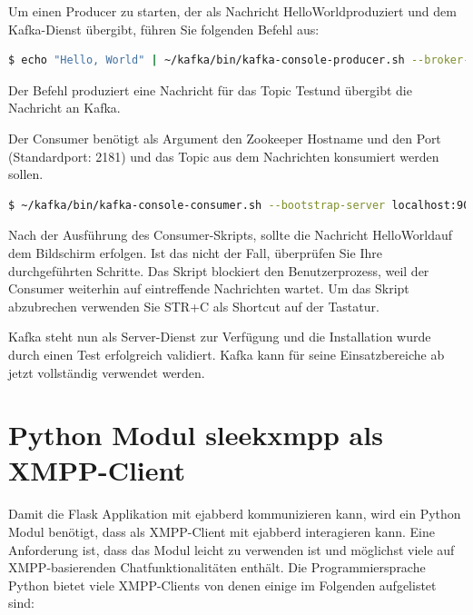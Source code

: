 \documentclass[a4paper,titlepage,halfparskip,12pt]{scrreprt}
\begin{document}
\begin{onehalfspacing}
Um einen Producer zu starten, der als Nachricht \glqq HelloWorld\grqq produziert und dem Kafka-Dienst übergibt, führen Sie folgenden Befehl aus:

\smallskip

\begin{lstlisting}[language=Bash]
$ echo "Hello, World" | ~/kafka/bin/kafka-console-producer.sh --broker-list localhost:9092 --topic Test > /dev/null
\end{lstlisting}

Der Befehl produziert eine Nachricht für das Topic \glqq Test\grqq und übergibt die Nachricht an Kafka.

Der Consumer benötigt als Argument den Zookeeper Hostname und den Port (Standardport: 2181) und das Topic aus dem Nachrichten konsumiert werden sollen.

\smallskip

\begin{lstlisting}[language=Bash]
$ ~/kafka/bin/kafka-console-consumer.sh --bootstrap-server localhost:9092 --topic Test --from-beginning
\end{lstlisting}

Nach der Ausführung des Consumer-Skripts, sollte die Nachricht \glqq HelloWorld\grqq auf dem Bildschirm erfolgen. Ist das nicht der Fall, überprüfen Sie Ihre durchgeführten Schritte. Das Skript blockiert den Benutzerprozess, weil der Consumer weiterhin auf eintreffende Nachrichten wartet. Um das Skript abzubrechen verwenden Sie STR+C als Shortcut auf der Tastatur.

Kafka steht nun als Server-Dienst zur Verfügung und die Installation wurde durch einen Test erfolgreich validiert. Kafka kann für seine Einsatzbereiche ab jetzt vollständig verwendet werden.

\pagebreak

\section{Python Modul sleekxmpp als \acs{XMPP}-Client}
\label{sec:SleekxmppModul}

Damit die Flask Applikation mit ejabberd kommunizieren kann, wird ein Python Modul benötigt, dass als \acs{XMPP}-Client mit ejabberd interagieren kann. Eine Anforderung ist, dass das Modul leicht zu verwenden ist und möglichst viele auf \acs{XMPP}-basierenden Chatfunktionalitäten enthält. Die Programmiersprache Python bietet viele \acs{XMPP}-Clients von denen einige im Folgenden aufgelistet sind:


\end{onehalfspacing}
\end{document}
